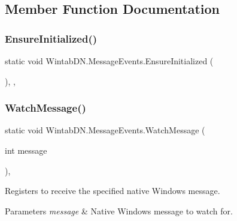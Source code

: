 \subsection{Member Function Documentation}
\mbox{\label{class_wintab_d_n_1_1_message_events_a560e49ea1588cadcdc66548f8a7c46c7}} 
\subsubsection{\texorpdfstring{Ensure\+Initialized()}{EnsureInitialized()}}
{\footnotesize\ttfamily static void Wintab\+D\+N.\+Message\+Events.\+Ensure\+Initialized (\begin{DoxyParamCaption}{ }\end{DoxyParamCaption})\hspace{0.3cm}{\ttfamily [inline]}, {\ttfamily [static]}, {\ttfamily [private]}}

\mbox{\label{class_wintab_d_n_1_1_message_events_a6e2e3e429a0a6b9d5e75d0d7a50c079d}} 
\subsubsection{\texorpdfstring{Watch\+Message()}{WatchMessage()}}
{\footnotesize\ttfamily static void Wintab\+D\+N.\+Message\+Events.\+Watch\+Message (\begin{DoxyParamCaption}\item[{int}]{message }\end{DoxyParamCaption})\hspace{0.3cm}{\ttfamily [inline]}, {\ttfamily [static]}}



Registers to receive the specified native Windows message. 


\begin{DoxyParams}{Parameters}
{\em message} & Native Windows message to watch for.\\
\hline
\end{DoxyParams}


